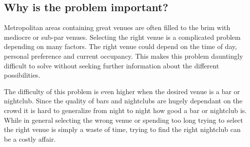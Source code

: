\subsection{Why is the problem important?}


Metropolitan areas containing great venues are often filled to the brim with mediocre or sub-par venues. Selecting the right venue is a complicated problem depending on many factors. The right venue could depend on the time of day, personal preference and current occupancy. This makes this problem dauntingly difficult to solve without seeking further information about the different possibilities.

The difficulty of this problem is even higher when the desired venue is a bar or nightclub. Since the quality of bars and nightclubs are hugely dependant on the crowd it is hard to generalize from night to night how good a bar or nightclub is. While in general selecting the wrong venue or spending too long trying to select the right venue is simply a waste of time, trying to find the right nightclub can be a costly affair.
